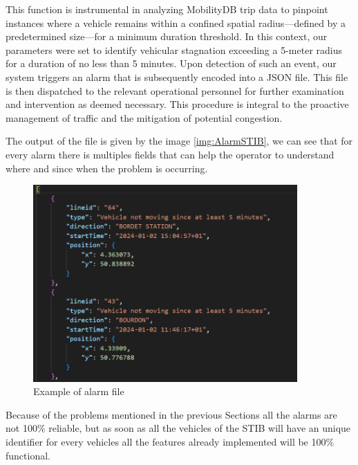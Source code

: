 \documentclass[12pt]{report}
\begin{document}
	
	
	This function is instrumental in analyzing MobilityDB trip data to pinpoint instances where a vehicle remains within a confined spatial radius—defined by a predetermined size—for a minimum duration threshold. In this context, our parameters were set to identify vehicular stagnation exceeding a 5-meter radius for a duration of no less than 5 minutes. Upon detection of such an event, our system triggers an alarm that is subsequently encoded into a JSON file. This file is then dispatched to the relevant operational personnel for further examination and intervention as deemed necessary. This procedure is integral to the proactive management of traffic and the mitigation of potential congestion.
	
	The output of the file is given by the image \ref{img:AlarmSTIB}, we can see that for every alarm there is multiples fields that can help the operator to understand where and since when the problem is occurring.
	
	\begin{center}
		\begin{figure}
			\centering
			\includegraphics[width=0.9\textwidth]{images/alarmSTIB.png}
			\caption{Example of alarm file}
			\label{alarmSTIB}
		\end{figure}
	\end{center}
	
	Because of the problems mentioned in the previous Sections all the alarms are not 100\% reliable, but as soon as all the vehicles of the STIB will have an unique identifier for every vehicles all the features already implemented will be 100\% functional. 
	
	
	
\end{document}

